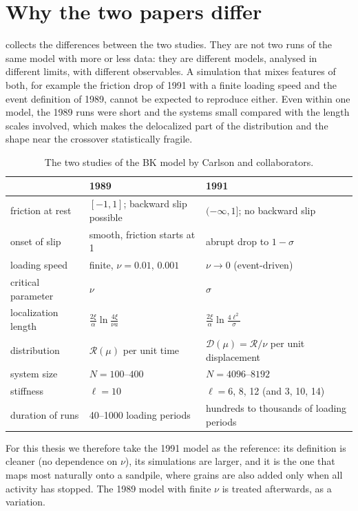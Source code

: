 \section{Why the two papers differ}
\label{sec:bk-differences}

 collects the differences between the two studies. They are not two runs of the same model with more or less data: they are different models,
analysed in different limits, with different observables. A simulation that mixes features of both, for example the friction drop of 1991 with a finite loading
speed and the event definition of 1989, cannot be expected to reproduce either. Even within one model, the 1989 runs were short and the systems small compared
with the length scales involved, which makes the delocalized part of the distribution and the shape near the crossover statistically fragile.

\begin{table}[t]
\centering
\caption{The two studies of the BK model by Carlson and collaborators.}
\label{tab:89vs91}
\begin{tabular}{@{}lp{55mm}p{55mm}@{}}
\toprule
 & 1989~\cite{CarlsonLanger1989} & 1991~\cite{Carlson1991} \\
\midrule
friction at rest & $[-1,1]$; backward slip possible & $(-\infty,1]$; no backward slip \\
onset of slip & smooth, friction starts at 1 & abrupt drop to $1-\sigma$ \\
loading speed & finite, $\nu = 0.01$, $0.001$ & $\nu\to0$ (event-driven) \\
critical parameter & $\nu$ & $\sigma$ \\
localization length & $\frac{2\xi}{\alpha}\ln\frac{4\xi}{\nu a}$ & $\frac{2\xi}{\alpha}\ln\frac{4\ell^2}{\sigma}$ \\
distribution & $\mathcal R(\mu)$ per unit time & $\mathcal D(\mu)=\mathcal R/\nu$ per unit displacement \\
system size & $N = 100$--$400$ & $N = 4096$--$8192$ \\
stiffness & $\ell = 10$ & $\ell = 6$, 8, 12 (and 3, 10, 14) \\
duration of runs & 40--1000 loading periods & hundreds to thousands of loading periods \\
\bottomrule
\end{tabular}
\end{table}

For this thesis we therefore take the 1991 model as the reference: its definition is cleaner (no dependence on $\nu$), its simulations are larger, and it is the one
that maps most naturally onto a sandpile, where grains are also added only when all activity has stopped. The 1989 model with finite $\nu$ is treated afterwards, as a
variation.

